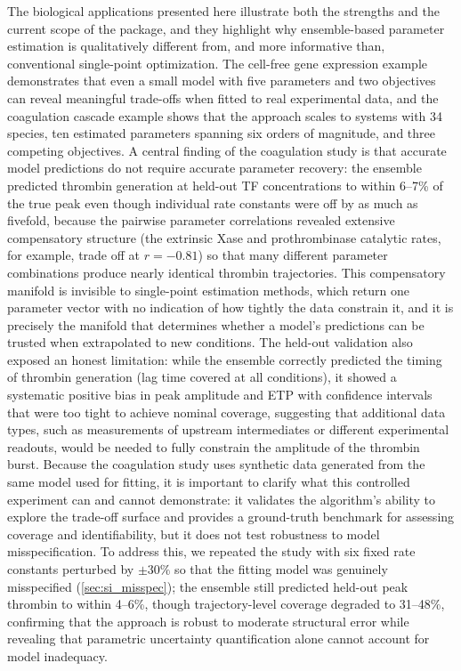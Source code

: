 \documentclass[preprint,review,12pt]{elsarticle}
\begin{document}
The biological applications presented here illustrate both the strengths and the current scope of the package, and they highlight why ensemble-based parameter estimation is qualitatively different from, and more informative than, conventional single-point optimization.
The cell-free gene expression example demonstrates that even a small model with five parameters and two objectives can reveal meaningful trade-offs when fitted to real experimental data, and the coagulation cascade example shows that the approach scales to systems with 34 species, ten estimated parameters spanning six orders of magnitude, and three competing objectives.
A central finding of the coagulation study is that accurate model predictions do not require accurate parameter recovery: the ensemble predicted thrombin generation at held-out TF concentrations to within 6--7\% of the true peak even though individual rate constants were off by as much as fivefold, because the pairwise parameter correlations revealed extensive compensatory structure (the extrinsic Xase and prothrombinase catalytic rates, for example, trade off at $r = -0.81$) so that many different parameter combinations produce nearly identical thrombin trajectories.
This compensatory manifold is invisible to single-point estimation methods, which return one parameter vector with no indication of how tightly the data constrain it, and it is precisely the manifold that determines whether a model's predictions can be trusted when extrapolated to new conditions.
The held-out validation also exposed an honest limitation: while the ensemble correctly predicted the timing of thrombin generation (lag time covered at all conditions), it showed a systematic positive bias in peak amplitude and ETP with confidence intervals that were too tight to achieve nominal coverage, suggesting that additional data types, such as measurements of upstream intermediates or different experimental readouts, would be needed to fully constrain the amplitude of the thrombin burst.
Because the coagulation study uses synthetic data generated from the same model used for fitting, it is important to clarify what this controlled experiment can and cannot demonstrate: it validates the algorithm's ability to explore the trade-off surface and provides a ground-truth benchmark for assessing coverage and identifiability, but it does not test robustness to model misspecification.
To address this, we repeated the study with six fixed rate constants perturbed by $\pm 30\%$ so that the fitting model was genuinely misspecified (\cref{sec:si_misspec}); the ensemble still predicted held-out peak thrombin to within 4--6\%, though trajectory-level coverage degraded to 31--48\%, confirming that the approach is robust to moderate structural error while revealing that parametric uncertainty quantification alone cannot account for model inadequacy.
\end{document}
